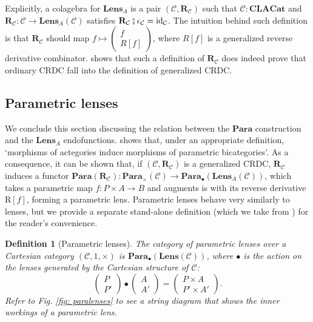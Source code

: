 \documentclass[11pt,a4paper,openright,twoside]{report}
\newcounter{mycounter}
\theoremstyle{plain}
\newtheorem{definition}[mycounter]{Definition}
\theoremstyle{definition}
\begin{document}
Explicitly, a colagebra for $\mathbf{Lens}_A$ is a pair $(\mathcal{C}, \mathbf{R}_{\mathcal{C}})$ such that $\mathcal{C}: \mathbf{CLACat}$ and $\mathbf{R}_{\mathcal{C}}: \mathcal{C} \to \mathbf{Lens}_A(\mathcal{C})$ satisfies $\mathbf{R}_{\mathcal{C}} \fatsemi \epsilon_{\mathcal{C}} = \mathrm{id}_{\mathcal{C}}$. The intuition behind such definition is that $\mathbf{R}_{\mathcal{C}}$ should map $f \mapsto \left(\begin{smallmatrix} f \\ R[f] \end{smallmatrix}\right)$, where $R[f]$ is a generalized reverse derivative combinator. \cite{gavranovic2024fundamental} shows that such a definition of $\mathbf{R}_{\mathcal{C}}$ does indeed prove that ordinary CRDC fall into the definition of generalized CRDC. 


\subsection{Parametric lenses}

We conclude this section discussing the relation between the $\mathbf{Para}$ construction and the $\mathbf{Lens}_A$ endofunctions. \cite{gavranovic2024fundamental} shows that, under an appropriate definition, \lq morphisms of actegories induce morphisms of parametric bicategories\rq. As a consequence, it can be shown that, if  $(\mathcal{C}, \mathbf{R}_{\mathcal{C}})$ is a generalized CRDC,  $\mathbf{R}_{\mathcal{C}}$ induces a functor $\mathbf{Para}(\mathbf{R}_{\mathcal{C}}): \mathbf{Para}_{\times}(\mathcal{C}) \to \mathbf{Para}_{\bullet}(\mathbf{Lens}_A(\mathcal{C}))$, which takes a parametric map $f: P \times A \to B$ and augments is with its reverse derivative $\mathrm{R}[f]$, forming a parametric lens. Parametric lenses behave very similarly to lenses, but we provide a separate stand-alone definition (which we take from \cite{cruttwell2022categorical}) for the reader's convenience.

\begin{definition}[Parametric lenses]
  The category of parametric lenses over a Cartesian category $(\mathcal{C},1,\times)$ is $\mathbf{Para}_{\bullet}(\mathbf{Lens}(\mathcal{C}))$, where $\bullet$ is the action on the lenses generated by the Cartesian structure of $\mathcal{C}$:
  \[\begin{pmatrix}
    P \\ P'
  \end{pmatrix} \bullet \begin{pmatrix}
    A \\ A'
  \end{pmatrix} = \begin{pmatrix}
    P \times A \\ P' \times A'
  \end{pmatrix}.\]
  Refer to \textit{Fig. \ref{fig: paralenses}} to see a string diagram that shows the inner workings of a parametric lens.
\end{definition}
\end{document}
